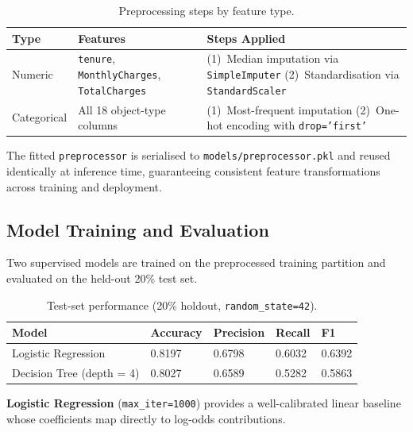 \documentclass[11pt]{article}
\begin{document}
\begin{table}[H]
\centering
\caption{Preprocessing steps by feature type.}
\label{tab:preprocess}
\renewcommand{\arraystretch}{1.5}
\begin{tabular}{L{3cm} L{4cm} L{6.5cm}}
\toprule
{}
\textbf{Type} & \textbf{Features} & \textbf{Steps Applied} \\
\midrule
Numeric &
\texttt{tenure},
\texttt{MonthlyCharges},
\texttt{TotalCharges} &
(1)~Median imputation via \texttt{SimpleImputer}\newline
(2)~Standardisation via \texttt{StandardScaler} \\
\addlinespace[4pt]
Categorical &
All 18 object-type columns &
(1)~Most-frequent imputation\newline
(2)~One-hot encoding with \texttt{drop='first'} \\
\bottomrule
\end{tabular}
\end{table}

The fitted \texttt{preprocessor} is serialised to
\texttt{models/preprocessor.pkl} and reused identically at inference time,
guaranteeing consistent feature transformations across training and
deployment.

\subsection{Model Training and Evaluation}

Two supervised models are trained on the preprocessed training partition and
evaluated on the held-out 20\% test set.

\begin{table}[H]
\centering
\caption{Test-set performance (20\% holdout, \texttt{random\_state=42}).}
\label{tab:metrics}
\renewcommand{\arraystretch}{1.6}
\begin{tabular}{L{5cm} C{2.2cm} C{2.2cm} C{2.2cm} C{2.2cm}}
\toprule
{}
\textbf{Model} & \textbf{Accuracy} & \textbf{Precision} & \textbf{Recall} & \textbf{F1} \\
\midrule
Logistic Regression         & 0.8197 & 0.6798 & 0.6032 & 0.6392 \\
Decision Tree (depth = 4)   & 0.8027 & 0.6589 & 0.5282 & 0.5863 \\
\bottomrule
\end{tabular}
\end{table}

\textbf{Logistic Regression} (\texttt{max\_iter=1000}) provides a
well-calibrated linear baseline whose coefficients map directly to log-odds
contributions.
\end{document}
